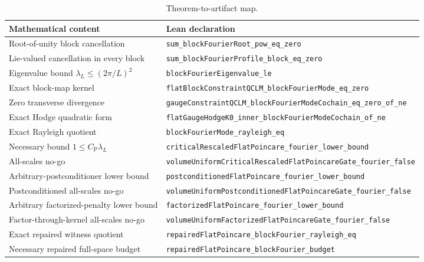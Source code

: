 \documentclass[11pt]{article}
\theoremstyle{definition}
\newcommand{\CP}{C_{\mathrm P}}
\newcommand{\codepath}[1]{\nolinkurl{#1}}
\begin{document}
\begin{table}[ht]
\centering
\small
\begin{tabular}{@{}>{\raggedright\arraybackslash}p{}
                  >{\raggedright\arraybackslash}p{}@{}}
\toprule
Mathematical content & Lean declaration \\
\midrule
Root-of-unity block cancellation &
\codepath{sum_blockFourierRoot_pow_eq_zero} \\
Lie-valued cancellation in every block &
\codepath{sum_blockFourierProfile_block_eq_zero} \\
Eigenvalue bound $\lambda_L\le(2\pi/L)^2$ &
\codepath{blockFourierEigenvalue_le} \\
Exact block-map kernel &
\codepath{flatBlockConstraintQCLM_blockFourierMode_eq_zero} \\
Zero transverse divergence &
\codepath{gaugeConstraintQCLM_blockFourierModeCochain_eq_zero_of_ne} \\
Exact Hodge quadratic form &
\codepath{flatGaugeHodgeK0_inner_blockFourierModeCochain_of_ne} \\
Exact Rayleigh quotient &
\codepath{blockFourierMode_rayleigh_eq} \\
Necessary bound $1\le\CP\lambda_L$ &
\codepath{criticalRescaledFlatPoincare_fourier_lower_bound} \\
All-scales no-go &
\codepath{volumeUniformCriticalRescaledFlatPoincareGate_fourier_false} \\
Arbitrary-postconditioner lower bound &
\codepath{postconditionedFlatPoincare_fourier_lower_bound} \\
Postconditioned all-scales no-go &
\codepath{volumeUniformPostconditionedFlatPoincareGate_fourier_false} \\
Arbitrary factorized-penalty lower bound &
\codepath{factorizedFlatPoincare_fourier_lower_bound} \\
Factor-through-kernel all-scales no-go &
\codepath{volumeUniformFactorizedFlatPoincareGate_fourier_false} \\
Exact repaired witness quotient &
\codepath{repairedFlatPoincare_blockFourier_rayleigh_eq} \\
Necessary repaired full-space budget &
\codepath{repairedFlatPoincare_blockFourier_budget} \\
\bottomrule
\end{tabular}
\caption{Theorem-to-artifact map.}
\label{tab:map}
\end{table}
\end{document}

